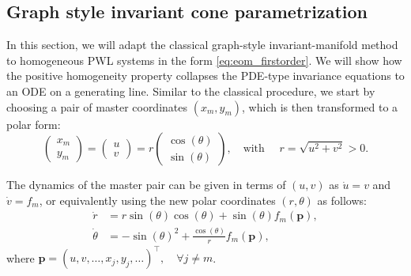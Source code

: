 \documentclass[a4paper,9pt,parskip=half,english]{article}
\theoremstyle{plain}
\theoremstyle{definition}
\newcommand{\T}{^{\!\top}} %
\newcommand{\vp}{\mathbf p}
\begin{document}
\subsection{Graph style invariant cone parametrization}
In this section, we will adapt the classical graph-style invariant-manifold method to homogeneous PWL systems in the form \eqref{eq:eom_firstorder}. We will show how the positive homogeneity property collapses the PDE-type invariance equations to an ODE on a generating line. Similar to the classical procedure, we start by choosing a pair of master coordinates $(x_m,y_m)$, which is then transformed to a polar form:
\begin{equation}\label{eq:master_polartrafo}
\begin{pmatrix}
x_m \\ y_m 
\end{pmatrix} = \begin{pmatrix}
u \\ v 
\end{pmatrix} = r \begin{pmatrix}
\cos(\theta) \\ \sin(\theta)
\end{pmatrix}, \quad \mbox{with } \quad r = \sqrt{u^2+v^2} > 0.
\end{equation}

The dynamics of the master pair can be given in terms of $(u,v)$ as $\dot{u}=v$ and $\dot{v}=f_m$, or equivalently using the new polar coordinates $(r,\theta)$ as follows: 
\begin{equation}\label{eq_ROM_in_polarCoordinates}
\begin{aligned} \dot{r} &= r \sin(\theta) \cos(\theta) + \sin(\theta) f_m(\vp), \\ \dot{\theta} &= - \sin(\theta)^2 + \frac{\cos(\theta)}{r} f_m(\vp), \end{aligned}
\end{equation}
where $\vp=(u, v, \ldots, x_j, y_j, \ldots )\T, \quad \forall j \neq m  $.
\end{document}
